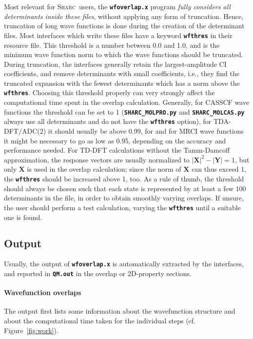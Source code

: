 \documentclass[a4paper,10pt,DIV=15,openany,twoside=false]{scrbook}
\newcommand{\sharc}{\textsc{Sharc}}
\newcommand{\ttt}[1]{\textbf{\texttt{#1}}}
\begin{document}
Most relevant for \sharc\ users, the \ttt{wfoverlap.x} program \emph{fully considers all determinants inside these files}, without applying any form of truncation. Hence, truncation of long wave functions is done during the creation of the determinant files.
Most interfaces which write these files have a keyword \ttt{wfthres} in their resource file. This threshold is a number between 0.0 and 1.0, and is the minimum wave function norm to which the wave functions should be truncated. During truncation, the interfaces generally retain the largest-amplitude CI coefficients, and remove determinants with small coefficients, i.e., they find the truncated expansion with the fewest determinants which has a norm above the \ttt{wfthres}.
Choosing this threshold properly can very strongly affect the computational time spent in the overlap calculation. Generally, for CASSCF wave functions the threshold can be set to 1 (\ttt{SHARC\_MOLPRO.py} and \ttt{SHARC\_MOLCAS.py} always use all determinants and do not have the \ttt{wfthres} option), for TDA-DFT/ADC(2) it should usually be above 0.99, for and for MRCI wave functions it might be necessary to go as low as 0.95, depending on the accuracy and performance needed.
For TD-DFT calculations without the Tamm-Damcoff approximation, the response vectors are usually normalized to $|\mathbf{X}|^2-|\mathbf{Y}|=1$, but only $\mathbf{X}$ is used in the overlap calculation; since the norm of $\mathbf{X}$ can thus exceed 1, the \ttt{wfthres} should be increased above 1, too.
As a rule of thumb, the threshold should always be chosen such that each state is represented by at least a few 100 determinants in the file, in order to obtain smoothly varying overlaps.
If unsure, the user should perform a test calculation, varying the \ttt{wfthres} until a suitable one is found.



\subsection{Output}

Usually, the output of \ttt{wfoverlap.x} is automatically extracted by the interfaces, and reported in \ttt{QM.out} in the overlap or 2D-property sections.

\paragraph{Wavefunction overlaps}

The output first lists some information about the wavefunction structure and about the computational time taken for the individual steps (cf. Figure~\ref{fig:work}).
\end{document}
